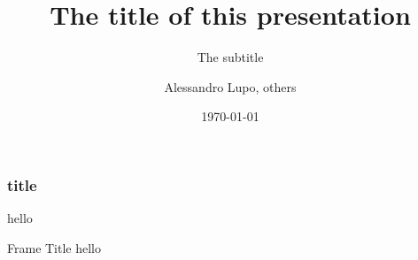 \documentclass[aspectratio=169,hyperref={pdfpagelabels=false}]{beamer}
\date{\today}
\title{The title of this presentation}
\subtitle{The subtitle}
\author{Alessandro Lupo, others}
\institute{Aix-Marseille Université}
\begin{document}
\maketitle

\begin{frame}
    \frametitle{title}

    hello
    
\end{frame}

\begin{frame}{Frame Title}
hello
    
\end{frame}
\end{document}
